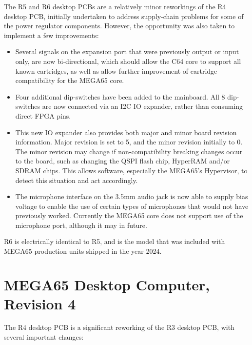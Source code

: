 The R5 and R6 desktop PCBs are a relatively minor reworkings of the R4 desktop PCB, initially undertaken to address supply-chain problems for some of the power regulator components. However, the opportunity was also taken to implement a few improvements:

\begin{itemize}
\item Several signals on the expansion port that were previously output or input only, are now bi-directional, which should allow the C64 core to support all known cartridges, as well as allow further improvement of cartridge compatibility for the MEGA65 core.
\item Four additional dip-switches have been added to the mainboard. All 8 dip-switches are now connected via an I2C IO expander, rather than consuming direct FPGA pins.
\item This new IO expander also provides both major and minor board revision information. Major revision is set to 5, and the minor revision initially to 0. The minor revision may change if non-compatibility breaking changes occur to the board, such as changing the QSPI flash chip, HyperRAM and/or SDRAM chips. This allows software, especially the MEGA65's Hypervisor, to detect this situation and act accordingly.
\item The microphone interface on the 3.5mm audio jack is now able to supply bias voltage to enable the use of certain types of microphones that would not have previously worked.  Currently the MEGA65 core does not support use of the microphone port, although it may in future.

\end{itemize}

R6 is electrically identical to R5, and is the model that was included with MEGA65 production units shipped in the year 2024.

\section{MEGA65 Desktop Computer, Revision 4}

The R4 desktop PCB is a significant reworking of the R3 desktop PCB, with several important changes:

